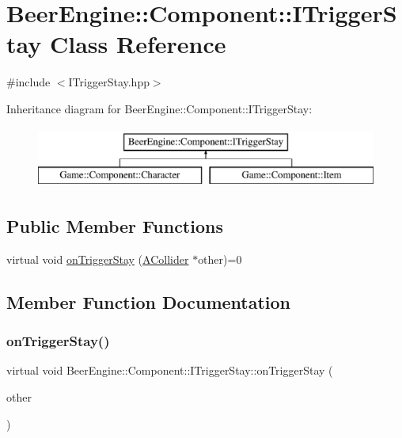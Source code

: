 \hypertarget{class_beer_engine_1_1_component_1_1_i_trigger_stay}{}\section{Beer\+Engine\+:\+:Component\+:\+:I\+Trigger\+Stay Class Reference}
\label{class_beer_engine_1_1_component_1_1_i_trigger_stay}


{\ttfamily \#include $<$I\+Trigger\+Stay.\+hpp$>$}

Inheritance diagram for Beer\+Engine\+:\+:Component\+:\+:I\+Trigger\+Stay\+:\begin{figure}[H]
\begin{center}
\leavevmode
\includegraphics[height=2.000000cm]{class_beer_engine_1_1_component_1_1_i_trigger_stay}
\end{center}
\end{figure}
\subsection*{Public Member Functions}
\begin{DoxyCompactItemize}
\item 
virtual void \mbox{\hyperlink{class_beer_engine_1_1_component_1_1_i_trigger_stay_ae0b762108ab5484071657e13f7a2cbd7}{on\+Trigger\+Stay}} (\mbox{\hyperlink{class_beer_engine_1_1_component_1_1_a_collider}{A\+Collider}} $\ast$other)=0
\end{DoxyCompactItemize}


\subsection{Member Function Documentation}
\mbox{\label{class_beer_engine_1_1_component_1_1_i_trigger_stay_ae0b762108ab5484071657e13f7a2cbd7}} 
\subsubsection{\texorpdfstring{on\+Trigger\+Stay()}{onTriggerStay()}}
{\footnotesize\ttfamily virtual void Beer\+Engine\+::\+Component\+::\+I\+Trigger\+Stay\+::on\+Trigger\+Stay (\begin{DoxyParamCaption}\item[{\mbox{\hyperlink{class_beer_engine_1_1_component_1_1_a_collider}{A\+Collider}} $\ast$}]{other }\end{DoxyParamCaption})\hspace{0.3cm}{\ttfamily [pure virtual]}}



